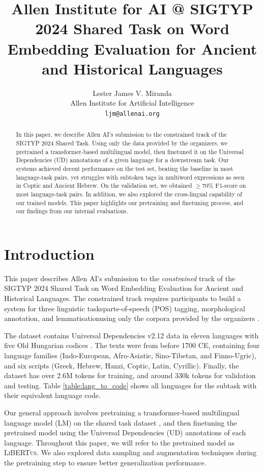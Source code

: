 \documentclass[11pt]{article}
\title{Allen Institute for AI @ SIGTYP 2024 Shared Task on Word Embedding Evaluation for Ancient and Historical Languages}
\author{Lester James V. Miranda \\
  Allen Institute for Artificial Intelligence \\
  \texttt{ljm@allenai.org} \\
}
\newcommand{\libertus}{\textsc{LiBERTus}}
\newcommand{\teamname}{Allen AI}
\begin{document}
\maketitle

\begin{abstract}
  In this paper, we describe \teamname{}'s submission to the constrained track of the SIGTYP 2024 Shared Task.
  Using only the data provided by the organizers, we pretrained a transformer-based multilingual model, then finetuned it on the Universal Dependencies (UD) annotations of a given language for a downstream task.
  Our systems achieved decent performance on the test set, beating the baseline in most language-task pairs, yet struggles with subtoken tags in multiword expressions as seen in Coptic and Ancient Hebrew.
  On the validation set, we obtained $\geq$70\% F1-score on most language-task pairs.
  In addition, we also explored the cross-lingual capability of our trained models.
  This paper highlights our pretraining and finetuning process, and our findings from our internal evaluations.
\end{abstract}

\section{Introduction}
This paper describes \teamname{}'s submission to the \textit{constrained} track of the SIGTYP 2024 Shared Task on Word Embedding Evaluation for Ancient and Historical Languages.
The constrained track requires participants to build a system for three linguistic tasks\textemdash parts-of-speech (POS) tagging, morphological annotation, and lemmatisation\textemdash using only the corpora provided by the organizers \cite{dereza-etal-2024-findings}.



The dataset contains Universal Dependencies v2.12 data \cite{zeman-etal-2023-universal} in eleven languages with five Old Hungarian codices \cite{has-2018-hungarian}.
The texts were from before 1700 CE, containing four language families (Indo-European, Afro-Asiatic, Sino-Tibetan, and Finno-Ugric), and six scripts (Greek, Hebrew, Hanzi, Coptic, Latin, Cyrillic).
Finally, the dataset has over 2.6M tokens for training, and around 330k tokens for validation and testing.
Table \ref{table:lang_to_code} shows all languages for the subtask with their equivalent language code.

Our general approach involves pretraining a transformer-based multilingual language model (LM) on the shared task dataset \citep{dereza-etal-2024-findings}, and then finetuning the pretrained model using the Universal Dependencies (UD) annotations of each language.
Throughout this paper, we will refer to the pretrained model as \libertus{}.
We also explored data sampling and augmentation techniques during the pretraining step to ensure better generalization performance.
\end{document}

